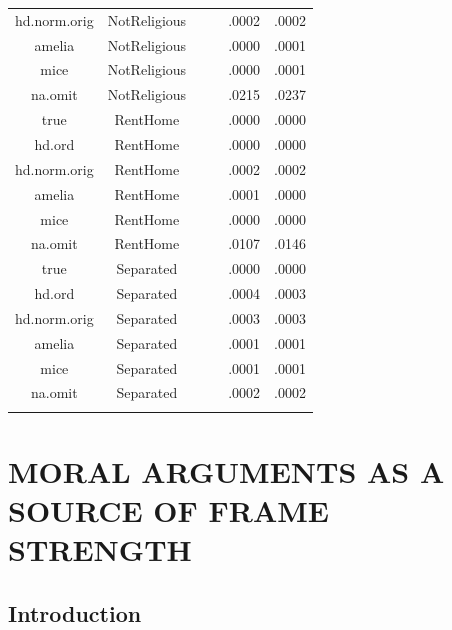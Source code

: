 \documentclass[12pt,econ]{sources/authesis}
\begin{document}
\begin{longtable}{@{\extracolsep{5pt}} cccccc}
hd.norm.orig & NotReligious &  &  & .0002 & .0002 \\ 
amelia & NotReligious &  &  & .0000 & .0001 \\ 
mice & NotReligious &  &  & .0000 & .0001 \\ 
na.omit & NotReligious &  &  & .0215 & .0237 \\ 
true & RentHome &  &  & .0000 & .0000 \\ 
hd.ord & RentHome &  &  & .0000 & .0000 \\ 
hd.norm.orig & RentHome &  &  & .0002 & .0002 \\ 
amelia & RentHome &  &  & .0001 & .0000 \\ 
mice & RentHome &  &  & .0000 & .0000 \\ 
na.omit & RentHome &  &  & .0107 & .0146 \\ 
true & Separated &  &  & .0000 & .0000 \\ 
hd.ord & Separated &  &  & .0004 & .0003 \\ 
hd.norm.orig & Separated &  &  & .0003 & .0003 \\ 
amelia & Separated &  &  & .0001 & .0001 \\ 
mice & Separated &  &  & .0001 & .0001 \\ 
na.omit & Separated &  &  & .0002 & .0002 \\ 
\hline \\[-1.8ex] 
\end{longtable}
\dsp

\hypertarget{framing}{%
\chapter{MORAL ARGUMENTS AS A SOURCE OF FRAME STRENGTH}\label{framing}}

\hypertarget{framing-intro}{%
\section{Introduction}\label{framing-intro}}
\end{document}
